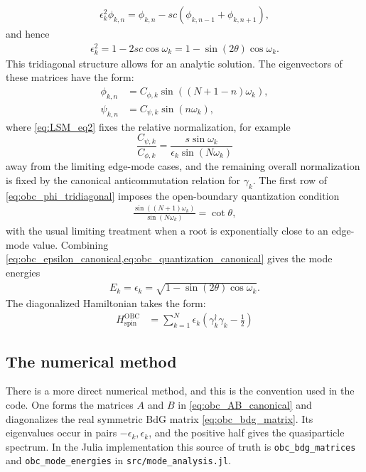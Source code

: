 \begin{align}
    \epsilon_k^2 \phi_{k,n}
        = \phi_{k,n}
          -sc(\phi_{k,n-1}+\phi_{k,n+1}),
\end{align}
and hence
\begin{align}
    \epsilon_k^2 = 1 - 2sc\cos\omega_k
                 = 1-\sin(2\theta)\cos\omega_k.
    \label{eq:obc_epsilon_canonical}
\end{align}
This tridiagonal structure allows for an analytic solution. The eigenvectors of these matrices have the form:
\begin{align}
    \phi_{k,n} &= C_{\phi,k}\sin((N+1-n)\omega_k),\\
    \psi_{k,n} &= C_{\psi,k}\sin(n\omega_k),
\end{align}
where \cref{eq:LSM_eq2} fixes the relative normalization, for example
\begin{equation}
    \frac{C_{\psi,k}}{C_{\phi,k}}
        = \frac{s\sin\omega_k}{\epsilon_k\sin(N\omega_k)}
\end{equation}
away from the limiting edge-mode cases, and the remaining overall normalization is fixed by the canonical anticommutation relation for $\gamma_k$.  The first row of \cref{eq:obc_phi_tridiagonal} imposes the open-boundary quantization condition
\begin{align}
    \frac{\sin((N+1)\omega_k)}{\sin(N\omega_k)} = \cot\theta,
    \label{eq:obc_quantization_canonical}
\end{align}
with the usual limiting treatment when a root is exponentially close to an edge-mode value.  Combining \cref{eq:obc_epsilon_canonical,eq:obc_quantization_canonical} gives the mode energies
\begin{align}
    E_k = \epsilon_k = \sqrt{1-\sin(2\theta)\cos\omega_k}.
\end{align}
The diagonalized Hamiltonian takes the form:
\begin{align}
    H_{\mathrm{spin}}^{\mathrm{OBC}} &= \sum_{k=1}^N \epsilon_k \left(\gamma_k^\dag \gamma_k - \frac{1}{2}\right)
\end{align}

\subsection{The numerical method}

There is a more direct numerical method, and this is the convention used in the code.  One forms the matrices $A$ and $B$ in \cref{eq:obc_AB_canonical} and diagonalizes the real symmetric BdG matrix \cref{eq:obc_bdg_matrix}.  Its eigenvalues occur in pairs $-\epsilon_k,\epsilon_k$, and the positive half gives the quasiparticle spectrum.  In the Julia implementation this source of truth is \texttt{obc\_bdg\_matrices} and \texttt{obc\_mode\_energies} in \texttt{src/mode\_analysis.jl}.

